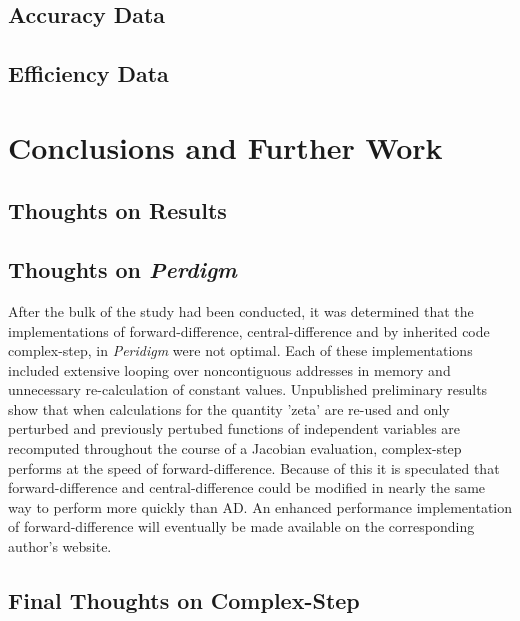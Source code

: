 \documentclass[preprint,12pt]{elsarticle}
\begin{document}
\subsection{Accuracy Data}
\subsection{Efficiency Data}

\section{Conclusions and Further Work}

\subsection{Thoughts on Results}


\subsection{Thoughts on \emph{Perdigm}}

After the bulk of the study had been conducted, it was determined that the implementations of
forward-difference, central-difference and by inherited code complex-step, in \emph{Peridigm} were
not optimal. Each of these implementations included extensive looping over noncontiguous addresses
in memory and unnecessary re-calculation of constant values. Unpublished preliminary results show
that when calculations for the quantity 'zeta' are re-used and only perturbed and previously
pertubed functions of independent variables are recomputed throughout the course of a Jacobian
evaluation, complex-step performs at the speed of forward-difference. Because of this it is
speculated that forward-difference and central-difference could be modified in nearly the same way to
perform more quickly than AD. An enhanced performance implementation of forward-difference will
eventually be made available on the corresponding author's website.

\subsection{Final Thoughts on Complex-Step}
\end{document}
